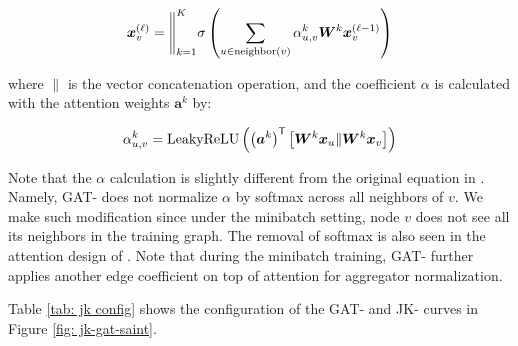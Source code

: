 \begin{equation}
    \bm{x}_v^{\left( \ell \right)}=\Bigg\|_{k=1}^K\sigma\left( \sum_{u\in\text{neighbor}\left( v \right)}\alpha_{u,v}^k \bm{W}^k\bm{x}_v^{\left( \ell-1 \right)} \right)
\end{equation}

where $\|$ is the vector concatenation operation, and the coefficient $\alpha$ is calculated with the attention weights $\bm{a}^k$ by:

\begin{equation}
    \alpha_{u,v}^k = \text{LeakyReLU}\left( \left( \bm{a}^k \right)^{\mathsf{T}}\left[\bm{W}^k\bm{x}_u\|\bm{W}^k\bm{x}_v\right] \right)
\end{equation}

Note that the $\alpha$ calculation is slightly different from the original equation in \cite{gat}. Namely, GAT-{\saint} does not normalize $\alpha$ by softmax across all neighbors of $v$. 
We make such modification since under the minibatch setting, node $v$ does not see all its neighbors in the training graph. The removal of softmax is also seen in the attention design of \cite{as-gcn}. 
Note that during the minibatch training, GAT-{\saint} further applies another edge coefficient on top of attention for aggregator normalization. 


Table \ref{tab: jk config} shows the configuration of the GAT-{\saint} and JK-{\saint} curves in Figure \ref{fig: jk-gat-saint}. %

\begin{table}
\caption{Training configuration of {\graphsaint} for Figure \ref{fig: jk-gat-saint} (Reddit)}
    \centering
    \label{tab: jk config}
\end{table}

